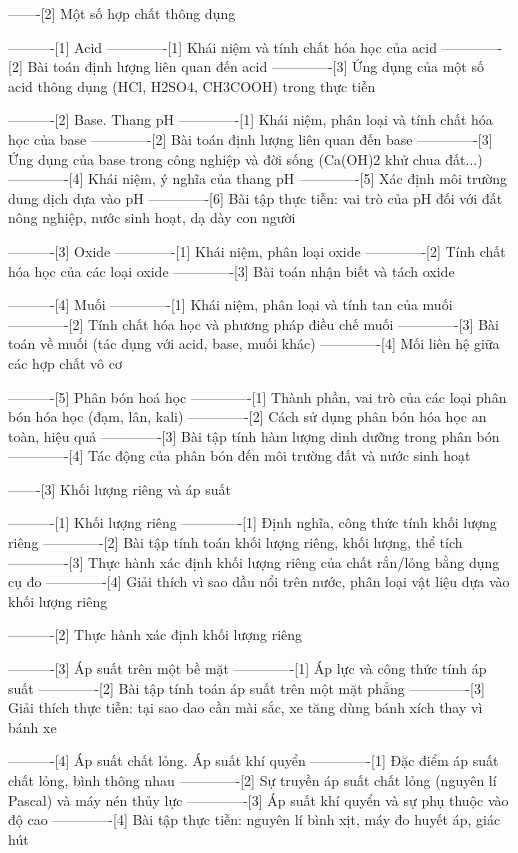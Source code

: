 -------[2] Một số hợp chất thông dụng

----------[1] Acid
-------------[1] Khái niệm và tính chất hóa học của acid
-------------[2] Bài toán định lượng liên quan đến acid
-------------[3] Ứng dụng của một số acid thông dụng (HCl, H2SO4, CH3COOH) trong thực tiễn

----------[2] Base. Thang pH
-------------[1] Khái niệm, phân loại và tính chất hóa học của base
-------------[2] Bài toán định lượng liên quan đến base
-------------[3] Ứng dụng của base trong công nghiệp và đời sống (Ca(OH)2 khử chua đất...)
-------------[4] Khái niệm, ý nghĩa của thang pH
-------------[5] Xác định môi trường dung dịch dựa vào pH
-------------[6] Bài tập thực tiễn: vai trò của pH đối với đất nông nghiệp, nước sinh hoạt, dạ dày con người

----------[3] Oxide
-------------[1] Khái niệm, phân loại oxide
-------------[2] Tính chất hóa học của các loại oxide
-------------[3] Bài toán nhận biết và tách oxide

----------[4] Muối
-------------[1] Khái niệm, phân loại và tính tan của muối
-------------[2] Tính chất hóa học và phương pháp điều chế muối
-------------[3] Bài toán về muối (tác dụng với acid, base, muối khác)
-------------[4] Mối liên hệ giữa các hợp chất vô cơ

----------[5] Phân bón hoá học
-------------[1] Thành phần, vai trò của các loại phân bón hóa học (đạm, lân, kali)
-------------[2] Cách sử dụng phân bón hóa học an toàn, hiệu quả
-------------[3] Bài tập tính hàm lượng dinh dưỡng trong phân bón
-------------[4] Tác động của phân bón đến môi trường đất và nước sinh hoạt

-------[3] Khối lượng riêng và áp suất

----------[1] Khối lượng riêng
-------------[1] Định nghĩa, công thức tính khối lượng riêng
-------------[2] Bài tập tính toán khối lượng riêng, khối lượng, thể tích
-------------[3] Thực hành xác định khối lượng riêng của chất rắn/lỏng bằng dụng cụ đo
-------------[4] Giải thích vì sao dầu nổi trên nước, phân loại vật liệu dựa vào khối lượng riêng

----------[2] Thực hành xác định khối lượng riêng

----------[3] Áp suất trên một bề mặt
-------------[1] Áp lực và công thức tính áp suất
-------------[2] Bài tập tính toán áp suất trên một mặt phẳng
-------------[3] Giải thích thực tiễn: tại sao dao cần mài sắc, xe tăng dùng bánh xích thay vì bánh xe

----------[4] Áp suất chất lỏng. Áp suất khí quyển
-------------[1] Đặc điểm áp suất chất lỏng, bình thông nhau
-------------[2] Sự truyền áp suất chất lỏng (nguyên lí Pascal) và máy nén thủy lực
-------------[3] Áp suất khí quyển và sự phụ thuộc vào độ cao
-------------[4] Bài tập thực tiễn: nguyên lí bình xịt, máy đo huyết áp, giác hút

